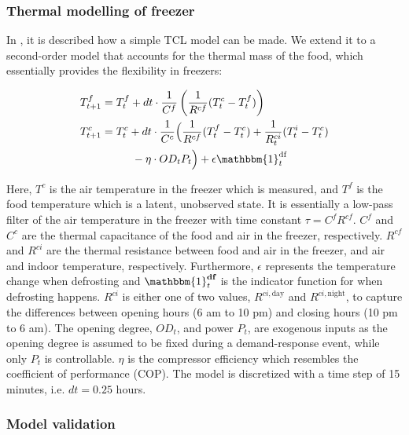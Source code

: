 \subsubsection{Thermal modelling of freezer}

In \cite{hao2014aggregate}, it is described how a simple TCL model can be made. We extend it to a second-order model that accounts for the thermal mass of the food, which essentially provides the flexibility in freezers:

\begin{subequations}\label{eq:2ndFreezerStateSpace}
    \begin{align}
        T^{f}_{t+1} & = T^{f}_{t} + dt \cdot \frac{1}{C^f}\left(\frac{1}{R^{cf}} (T^{c}_{t} - T^{f}_{t}) \right)                                                                              \\
        T^{c}_{t+1} & = T^{c}_t + dt \cdot \frac{1}{C^c}\Bigl(\frac{1}{R^{cf}} (T^{f}_t - T^{c}_t) + \frac{1}{R^{ci}_{t}} (T^{i}_t - T^{c}_t)                                          \notag \\ & \mspace{50mu} - \eta \cdot OD_t P_t \Bigr) + \epsilon \mathbbm{1}^{\text{df}}_{t}
    \end{align}
\end{subequations}

Here, $T^c$ is the air temperature in the freezer which is measured, and $T^f$ is the food temperature which is a latent, unobserved state. It is essentially a low-pass filter of the air temperature in the freezer with time constant $\tau = C^f R^{cf}$. $C^f$ and $C^c$ are the thermal capacitance of the food and air in the freezer, respectively. $R^{cf}$ and $R^{ci}$ are the thermal resistance between food and air in the freezer, and air and indoor temperature, respectively. Furthermore, $\epsilon$ represents the temperature change when defrosting and $\mathbbm{1}^{\textbf{df}}_{t}$ is the indicator function for when defrosting happens. $R^{ci}$ is either one of two values, $R^{ci, \text{day}}$ and $R^{ci, \text{night}}$, to capture the differences between opening hours (6 am to 10 pm) and closing hours (10 pm to 6 am). The opening degree, $OD_t$, and power $P_t$, are exogenous inputs as the opening degree is assumed to be fixed during a demand-response event, while only $P_t$ is controllable. $\eta$ is the compressor efficiency which resembles the coefficient of performance (COP). The model is discretized with a time step of 15 minutes, i.e. $dt = 0.25$ hours.

\subsubsection{Model validation}

